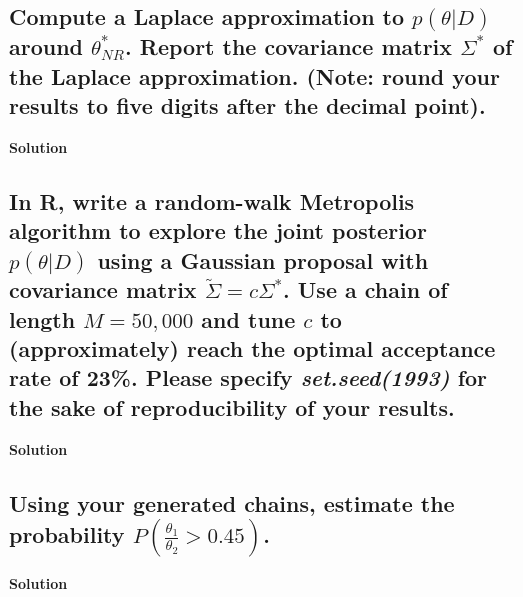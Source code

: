 \documentclass[12pt]{article}
\begin{document}
\subsection{Compute a Laplace approximation to \( p(\theta|D) \) around \( \theta^*_{NR} \). Report the covariance matrix \( \Sigma^* \) of the Laplace approximation. (Note: round your results to five digits after the decimal point).}
\textbf{Solution}

\subsection{In R, write a random-walk Metropolis algorithm to explore the joint posterior \( p(\theta|D) \) using a Gaussian proposal with covariance matrix \( \tilde{\Sigma} = c\Sigma^* \). Use a chain of length \( M = 50,000 \) and tune \( c \) to (approximately) reach the optimal acceptance rate of 23\%. Please specify \textit{set.seed(1993)} for the sake of reproducibility of your results.}
\textbf{Solution}

\subsection{Using your generated chains, estimate the probability \( P\left(\frac{\theta_1}{\theta_2} > 0.45\right) \).}
\textbf{Solution}

\printbibliography
\end{document}
